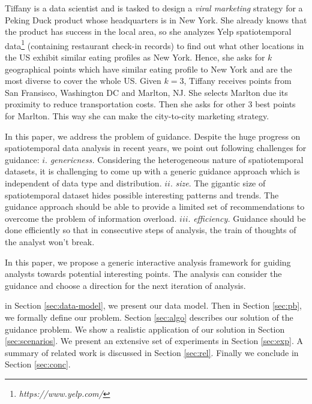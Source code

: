 \begin{example}
\label{ex:flight}
Tiffany is a data scientist and is tasked to design a {\em viral marketing} strategy for a Peking Duck product whose headquarters is in New York. She already knows that the product has success in the local area, so she analyzes Yelp spatiotemporal data\footnote{\it https://www.yelp.com/} (containing restaurant check-in records) to find out what other locations in the US exhibit similar eating profiles as New York. Hence, she asks for $k$ geographical points which have similar eating profile to New York and are the most diverse to cover the whole US. Given $k=3$, Tiffany receives points from San Fransisco, Washington DC and Marlton, NJ. She selects Marlton due its proximity to reduce transportation costs. Then she asks for other 3 best points for Marlton. This way she can make the city-to-city marketing strategy.
\end{example}

 In this paper, we address the problem of guidance. Despite the huge progress on spatiotemporal data analysis in recent years, we point out following challenges for guidance: $i.$ {\em genericness.} Considering the heterogeneous nature of spatiotemporal datasets, it is challenging to come up with a generic guidance approach which is independent of data type and distribution. $ii.$ {\em size}. The gigantic size of spatiotemporal dataset hides possible interesting patterns and trends. The guidance approach should be able to provide a limited set of recommendations to overcome the problem of information overload. $iii.$ {\em efficiency.} Guidance should be done efficiently so that in consecutive steps of analysis, the train of thoughts of the analyst won't break.

\vspace{5pt}
In this paper, we propose a generic interactive analysis framework for guiding analysts towards potential interesting points. The analysis can consider the guidance and choose a direction for the next iteration of analysis. 

\vspace{5pt}
 in Section \ref{sec:data-model}, we
present our data model. Then in Section \ref{sec:pb}, we formally define our problem. Section \ref{sec:algo} describes our solution of the guidance problem. We show a realistic application of our solution in Section \ref{sec:scenarios}. We present an extensive set of experiments in Section \ref{sec:exp}. A summary of related work is discussed in Section \ref{sec:rel}. Finally we conclude in Section \ref{sec:conc}.